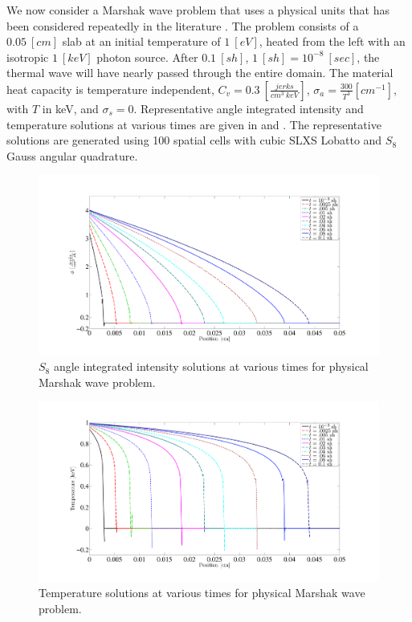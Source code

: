 We now consider a Marshak wave problem that uses a physical units that has been considered repeatedly in the literature \cite{negative_trt,time_adaptive_diffusion,physical_marshak}.
The problem consists of a $0.05~[cm]$ slab at an initial temperature of $1~[eV]$, heated from the left with an isotropic $1~[keV]$ photon source.
After $0.1~[sh]$, $1~[sh]=10^{-8}~[sec]$, the thermal wave will have nearly passed through the entire domain.
The material heat capacity is temperature independent, $C_v = 0.3~[\frac{jerks}{cm^3~keV}]$, $\sigma_a = \frac{300}{T^3} [cm^{-1}]$, with $T$ in keV, and $\sigma_s = 0$.
Representative angle integrated intensity and temperature solutions at various times are given in  and .    
The representative solutions are generated using 100 spatial cells with cubic SLXS Lobatto and $S_8$ Gauss angular quadrature.
\begin{figure}[!htp]
\centering
\includegraphics[width=16cm,trim=2in  0.4in 0.5in 0.75in,clip=true]{chapter6_grey_radtran/Dissertation_Data/100C_Physical_Marshak_Wave_Radiation_Times.pdf}
\caption{$S_{8}$ angle integrated intensity solutions at various times for physical Marshak wave problem.}
\label{fig:physical_slices_radiation}
\end{figure}
\begin{figure}[!hbp]
\centering
\includegraphics[width=16cm,trim=2in  0.4in 0.5in 0.75in,clip=true]{chapter6_grey_radtran/Dissertation_Data/100C_Physical_Marshak_Wave_Temperature_Times.pdf}
\caption{Temperature solutions at various times for physical Marshak wave problem.}
\label{fig:physical_slices_temperature}
\end{figure}
